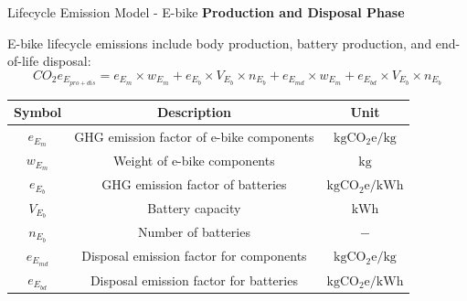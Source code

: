 \documentclass[9pt]{beamer}
\begin{document}
\begin{frame}{Lifecycle Emission Model - E-bike}
  \textbf{Production and Disposal Phase}

  E-bike lifecycle emissions include body production, battery production, and end-of-life disposal:
  \begin{equation}
    CO_2e_{E_{pro+dis}} = e_{E_m} \times w_{E_m} + e_{E_b} \times V_{E_b} \times n_{E_b} + e_{E_{md}} \times w_{E_m} + e_{E_{bd}} \times V_{E_b} \times n_{E_b}
  \end{equation}

  \vspace{0.1cm}
  \small

  \begin{center}
    \begin{tabular}{c c c}
      \toprule
      Symbol & Description & Unit \\
      \midrule
      $e_{E_m}$ & GHG emission factor of e-bike components & $\mathrm{kg CO_2e/kg}$ \\
      $w_{E_m}$ & Weight of e-bike components & $\mathrm{kg}$ \\
      $e_{E_b}$ & GHG emission factor of batteries & $\mathrm{kg CO_2e/kWh}$ \\
      $V_{E_b}$ & Battery capacity & $\mathrm{kWh}$ \\
      $n_{E_b}$ & Number of batteries & $\mathrm{-}$ \\
      $e_{E_{md}}$ & Disposal emission factor for components & $\mathrm{kg CO_2e/kg}$ \\
      $e_{E_{bd}}$ & Disposal emission factor for batteries & $\mathrm{kg CO_2e/kWh}$ \\
      \bottomrule
    \end{tabular}
  \end{center}

\end{frame}
\end{document}
